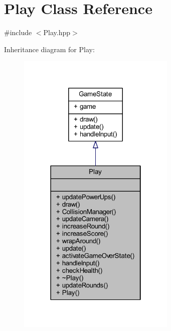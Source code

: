 \hypertarget{class_play}{}\section{Play Class Reference}
\label{class_play}


{\ttfamily \#include $<$Play.\+hpp$>$}



Inheritance diagram for Play\+:
\nopagebreak
\begin{figure}[H]
\begin{center}
\leavevmode
\includegraphics[width=214pt]{class_play__inherit__graph}
\end{center}
\end{figure}


